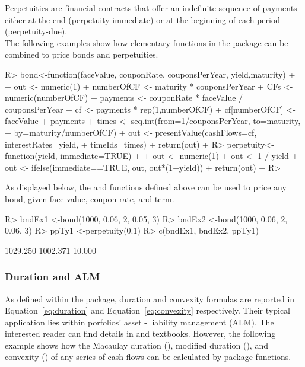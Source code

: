 \documentclass[nojss]{jss}
\begin{document}
Perpetuities are financial contracts that offer an indefinite sequence of
payments either at the end (perpetuity-immediate) or at the beginning of each
period (perpetuity-due).\\

The following examples show how elementary functions in the   package can be combined to price bonds and perpetuities.
\begin{Schunk}
\begin{Sinput}
R> bond<-function(faceValue, couponRate, couponsPerYear, yield,maturity)
+  {
+  	out <- numeric(1)
+  	numberOfCF <- maturity * couponsPerYear
+  	CFs <- numeric(numberOfCF)
+  	payments <- couponRate * faceValue / couponsPerYear 
+  	cf <- payments * rep(1,numberOfCF)
+  	cf[numberOfCF] <- faceValue + payments 
+  	times <- seq.int(from=1/couponsPerYear, to=maturity, 
+                  by=maturity/numberOfCF)
+  	out <- presentValue(cashFlows=cf, interestRates=yield, 
+                     timeIds=times)
+  	return(out)
+  }
R> perpetuity<-function(yield, immediate=TRUE)
+  {
+  	out <- numeric(1)
+  	out <- 1 / yield
+  	out <- ifelse(immediate==TRUE, out, out*(1+yield))
+  	return(out)
+  }
R> 
\end{Sinput}
\end{Schunk}

As displayed below, the  and  functions defined above can be used to price
any bond, given face value, coupon rate, and term.

\begin{Schunk}
\begin{Sinput}
R> bndEx1 <-bond(1000, 0.06, 2, 0.05, 3)
R> bndEx2 <-bond(1000, 0.06, 2, 0.06, 3)
R> ppTy1 <-perpetuity(0.1)
R> c(bndEx1, bndEx2, ppTy1)
\end{Sinput}
\begin{Soutput}
[1] 1029.250 1002.371   10.000
\end{Soutput}
\end{Schunk}


\subsubsection{Duration and ALM}\label{sss:DurationAndAlm}


As defined within the package, duration and convexity formulas are reported in
Equation~\ref{eq:duration} and Equation~\ref{eq:convexity} respectively. Their typical application lies within
porfolios' asset - liability management (ALM).
The interested reader can find details
in \cite{mathFinAct} and \cite{broverman2008mathematics} textbooks.
However, the following example shows how the Macaulay duration
(), modified duration (), and convexity () of any series of cash flows can 
be calculated by  package functions.\\
\end{document}
